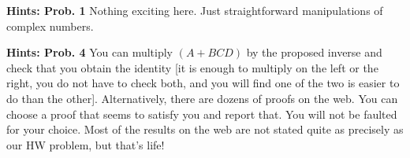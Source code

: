 \documentclass[letterpaper]{article}
\begin{document}
\noindent \textbf{Hints: Prob. 1} Nothing exciting here. Just straightforward manipulations of complex numbers.

\vspace{1cm}

\noindent \textbf{Hints: Prob. 4} You can multiply $(A+BCD)$ by the proposed inverse and check that you obtain the identity [it is enough to multiply on the left or the right, you do not have to check both, and you will find one of the two is easier to do than the other]. Alternatively, there are dozens of proofs on the web. You can choose a proof that seems to satisfy you and report that. You will not be faulted for your choice.  Most of the results on the web are not stated quite as precisely as our HW problem, but that's  life!

\vspace{1cm}
\end{document}
